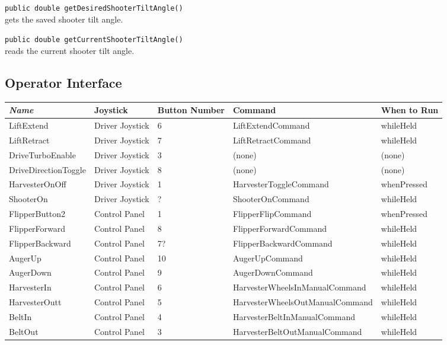 \documentclass[]{article}
\begin{document}
\noindent
\lstinline[]|public double getDesiredShooterTiltAngle()| \\
gets the saved shooter tilt angle.

\noindent
\lstinline[]|public double getCurrentShooterTiltAngle()| \\
reads the current shooter tilt angle.


\subsection{Operator Interface}

\begin{tabular}{|l|l|l|l|l|}
\hline \emph{Name} & \textbf{Joystick} & Button Number & Command & When to Run \\ 
\hline LiftExtend & Driver Joystick & 6 & LiftExtendCommand & whileHeld  \\ 
\hline LiftRetract & Driver Joystick & 7 & LiftRetractCommand & whileHeld  \\ 
\hline DriveTurboEnable & Driver Joystick & 3 & (none) & (none)  \\ 
\hline DriveDirectionToggle & Driver Joystick & 8 & (none) & (none)  \\ 
\hline HarvesterOnOff & Driver Joystick & 1 & HarvesterToggleCommand & whenPressed  \\ 
\hline ShooterOn & Driver Joystick & ? & ShooterOnCommand & whileHeld  \\ 
\hline FlipperButton2 & Control Panel & 1 & FlipperFlipCommand & whenPressed  \\ 
\hline FlipperForward & Control Panel & 8 & FlipperForwardCommand & whileHeld  \\ 
\hline FlipperBackward & Control Panel &7? & FlipperBackwardCommand & whileHeld  \\ 
\hline AugerUp & Control Panel & 10 & AugerUpCommand & whileHeld  \\ 
\hline AugerDown & Control Panel & 9 & AugerDownCommand & whileHeld  \\ 
\hline HarvesterIn & Control Panel & 6 & HarvesterWheelsInManualCommand & whileHeld  \\ 
\hline HarvesterOutt & Control Panel & 5 & HarvesterWheelsOutManualCommand & whileHeld \\ 
\hline BeltIn & Control Panel & 4 & HarvesterBeltInManualCommand & whileHeld  \\ 
\hline BeltOut & Control Panel & 3 & HarvesterBeltOutManualCommand & whileHeld \\ 

\end{tabular}
\end{document}
